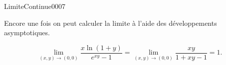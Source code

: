 \begin{corrige}{LimiteContinue0007}

Encore une fois on peut calculer la limite à l'aide des développements asymptotiques. 

\begin{equation}
 \lim_{(x,y)\to (0,0)} \frac{x \ln(1+y)}{e^{xy}-1}=\lim_{(x,y)\to (0,0)} \frac{xy}{1+xy-1}=1.
\end{equation}

\end{corrige}
